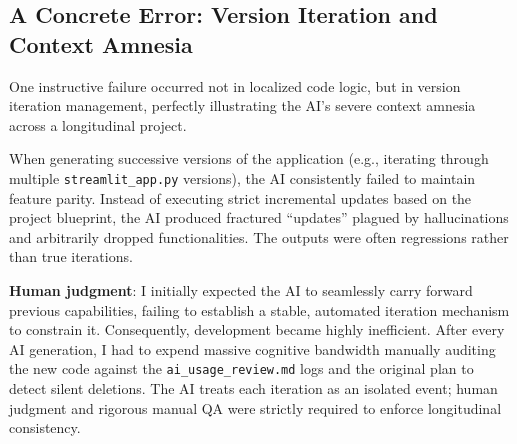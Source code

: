



\subsection{A Concrete Error: Version Iteration and Context Amnesia}

One instructive failure occurred not in localized code logic, but in version iteration management, perfectly illustrating the AI's severe context amnesia across a longitudinal project. 

When generating successive versions of the application (e.g., iterating through multiple \texttt{streamlit\_app.py} versions), the AI consistently failed to maintain feature parity. Instead of executing strict incremental updates based on the project blueprint, the AI produced fractured ``updates'' plagued by hallucinations and arbitrarily dropped functionalities. The outputs were often regressions rather than true iterations. 

\textbf{Human judgment}: I initially expected the AI to seamlessly carry forward previous capabilities, failing to establish a stable, automated iteration mechanism to constrain it. Consequently, development became highly inefficient. After every AI generation, I had to expend massive cognitive bandwidth manually auditing the new code against the \texttt{ai\_usage\_review.md} logs and the original plan to detect silent deletions. The AI treats each iteration as an isolated event; human judgment and rigorous manual QA were strictly required to enforce longitudinal consistency.

